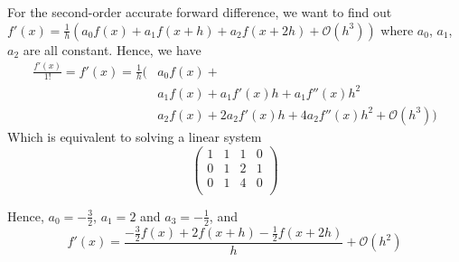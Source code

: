 \documentclass[
	12pt, %
]{fphw}
\numberwithin{equation}{section}
\numberwithin{figure}{section}
\numberwithin{table}{section}
\begin{document}
For the second-order accurate forward difference,
we want to find out $f'(x)=\frac{1}{h}(a_0f(x)+a_1f(x+h)+a_2f(x+2h)+\mathcal{O}(h^3))$
where $a_0$, $a_1$, $a_2$ are all constant.
Hence, we have
\begin{equation}
	\begin{aligned}
		\frac{f'(x)}{1 !} = f'(x)= \frac{1}{h}( & a_0 f(x)+                                         \\
		                                        & a_1 f(x)+a_1 f'(x) h+a_1 f''(x) h^2               \\
		                                        & a_2 f(x)+2 a_2 f'(x) h+4 a_2 f''(x) h^2 + \mathcal{O}(h^3))
	\end{aligned}
\end{equation}
Which is equivalent to solving a linear system
\begin{equation}
	\left(
	\begin{array}{ccc|c}
		1 & 1 & 1 & 0 \\
		0 & 1 & 2 & 1 \\
		0 & 1 & 4 & 0 \\
	\end{array}
	\right)
\end{equation}

Hence, $a_0 = -\frac{3}{2}$, $a_1=2$ and $a_3 = -\frac{1}{2}$, and
\begin{equation}f' (x)=\frac{-\frac{3}{2}f (x)+2f (x+h) -\frac{1}{2}f (x+2h)}{h}+\mathcal{O}(h^2)\end{equation}
\end{document}

